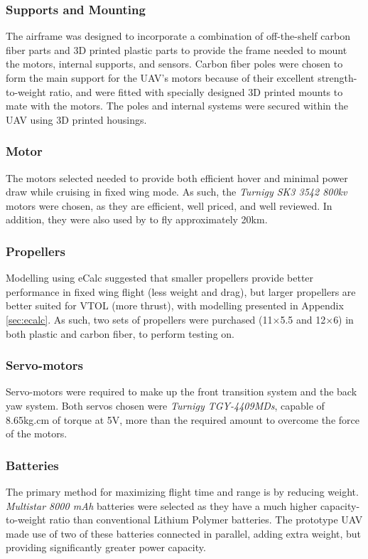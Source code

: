 \subsubsection*{Supports and Mounting}
The airframe was designed to incorporate a combination of off-the-shelf carbon fiber parts and 3D printed plastic parts to provide the frame needed to mount the motors, internal supports, and sensors. Carbon fiber poles were chosen to form the main support for the UAV's motors because of their excellent strength-to-weight ratio, and were fitted with specially designed 3D printed mounts to mate with the motors. The poles and internal systems were secured within the UAV using 3D printed housings.
	
\subsubsection*{Motor}
The motors selected needed to provide both efficient hover and minimal power draw while cruising in fixed wing mode. As such, the \textit{Turnigy SK3 3542 800kv} motors were chosen, as they are efficient, well priced, and well reviewed. In addition, they were also used by \cite{ref:fireflyinstruction} to fly approximately 20km.
	
\subsubsection*{Propellers}
Modelling using eCalc suggested that smaller propellers provide better performance in fixed wing flight (less weight and drag), but larger propellers are better suited for VTOL (more thrust), with modelling presented in Appendix \ref{sec:ecalc}. As such, two sets of propellers were purchased (11$\times$5.5 and 12$\times$6) in both plastic and carbon fiber, to perform testing on.
	
\subsubsection*{Servo-motors}
Servo-motors were required to make up the front transition system and the back yaw system. Both servos chosen were \textit{Turnigy TGY-4409MDs}, capable of 8.65kg.cm of torque at 5V, more than the required amount to overcome the force of the motors. 
		
\subsubsection*{Batteries}
The primary method for maximizing flight time and range is by reducing weight. \textit{Multistar 8000 mAh} batteries were selected as they have a much higher capacity-to-weight ratio than conventional Lithium Polymer batteries. The prototype UAV made use of two of these batteries connected in parallel, adding extra weight, but providing significantly greater power capacity.

